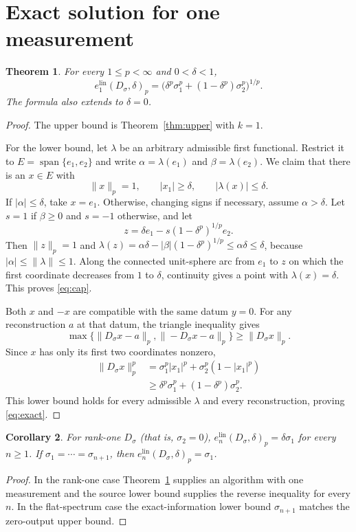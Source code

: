 \documentclass[11pt]{article}
\newtheorem{theorem}{Theorem}[section]
\newtheorem{corollary}[theorem]{Corollary}
\newcommand{\elin}{e^{\mathrm{lin}}}
\newcommand{\ds}{D_\sigma}
\begin{document}
\section{Exact solution for one measurement}
\begin{theorem}\label{thm:exact}
For every $1\leq p<\infty$ and $0<\delta<1$,
\begin{equation}\label{eq:exact}
 \boxed{\quad
 \elin_1(\ds,\delta)_p
 =\bigl(\delta^p\sigma_1^p+(1-\delta^p)\sigma_2^p\bigr)^{1/p}.
 \quad}
\end{equation}
The formula also extends to $\delta=0$.
\end{theorem}
\begin{proof}
The upper bound is Theorem~\ref{thm:upper} with $k=1$.

For the lower bound, let $\lambda$ be an arbitrary admissible first
functional.  Restrict it to $E=\operatorname{span}\{e_1,e_2\}$ and write
$\alpha=\lambda(e_1)$ and $\beta=\lambda(e_2)$.  We claim that there is an
$x\in E$ with
\begin{equation}\label{eq:cap}
 \|x\|_p=1,\qquad |x_1|\geq\delta,\qquad |\lambda(x)|\leq\delta.
\end{equation}
If $|\alpha|\leq\delta$, take $x=e_1$.  Otherwise, changing signs if
necessary, assume $\alpha>\delta$.  Let $s=1$ if $\beta\geq0$ and $s=-1$
otherwise, and let
\[
 z=\delta e_1-s
 (1-\delta^p)^{1/p}e_2.
\]
Then $\|z\|_p=1$ and
$\lambda(z)=\alpha\delta-|\beta|(1-\delta^p)^{1/p}\leq\alpha\delta\leq\delta$,
because $|\alpha|\leq\|\lambda\|\leq1$.  Along the connected unit-sphere
arc from $e_1$ to $z$ on which the first coordinate decreases from $1$ to
$\delta$, continuity gives a point with $\lambda(x)=\delta$.  This proves
\eqref{eq:cap}.

Both $x$ and $-x$ are compatible with the same datum $y=0$.  For any
reconstruction $a$ at that datum, the triangle inequality gives
\[
 \max\{\|\ds x-a\|_p,\|-\ds x-a\|_p\}\geq\|\ds x\|_p.
\]
Since $x$ has only its first two coordinates nonzero,
\begin{align*}
 \|\ds x\|_p^p
 &=\sigma_1^p|x_1|^p+\sigma_2^p(1-|x_1|^p)\\
 &\geq \delta^p\sigma_1^p+(1-\delta^p)\sigma_2^p.
\end{align*}
This lower bound holds for every admissible $\lambda$ and every
reconstruction, proving \eqref{eq:exact}.
\end{proof}

\begin{corollary}
For rank-one $D_\sigma$ (that is, $\sigma_2=0$),
$\elin_n(D_\sigma,\delta)_p=\delta\sigma_1$ for every $n\geq1$.  If
$\sigma_1=\cdots=\sigma_{n+1}$, then
$\elin_n(D_\sigma,\delta)_p=\sigma_1$.
\end{corollary}
\begin{proof}
In the rank-one case Theorem~\ref{thm:exact} supplies an algorithm with one
measurement and the source lower bound supplies the reverse inequality for
every $n$.  In the flat-spectrum case the exact-information lower bound
$\sigma_{n+1}$ matches the zero-output upper bound.
\end{proof}
\end{document}
